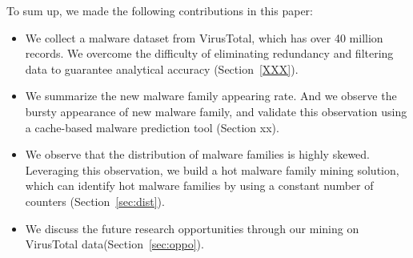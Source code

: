 To sum up, we made the following contributions in this paper:
\begin{itemize}
\item We collect a malware dataset from VirusTotal, which has over 40 million records. We overcome the difficulty of eliminating redundancy and filtering data to guarantee analytical accuracy (Section~\ref{XXX}).

\item We summarize the new malware family appearing rate. And we observe the bursty appearance of new malware family, and validate this observation using a cache-based malware prediction tool (Section xx).
\item We observe that the distribution of malware families is highly skewed. Leveraging this observation, we build a hot malware family mining solution, which can identify hot malware families by using a constant number of counters (Section~\ref{sec:dist}).
\item We discuss the future research opportunities through our mining on VirusTotal data(Section~\ref{sec:oppo}). 
\end{itemize}
